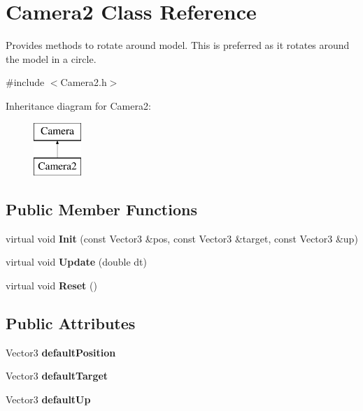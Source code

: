 \hypertarget{class_camera2}{\section{Camera2 Class Reference}
\label{class_camera2}
}


Provides methods to rotate around model. This is preferred as it rotates around the model in a circle.  




{\ttfamily \#include $<$Camera2.\+h$>$}

Inheritance diagram for Camera2\+:\begin{figure}[H]
\begin{center}
\leavevmode
\includegraphics[height=2.000000cm]{class_camera2}
\end{center}
\end{figure}
\subsection*{Public Member Functions}
\begin{DoxyCompactItemize}
\item 
\hypertarget{class_camera2_af3d4e37be651bac9c0a94ac0af021c35}{virtual void {\bfseries Init} (const Vector3 \&pos, const Vector3 \&target, const Vector3 \&up)}\label{class_camera2_af3d4e37be651bac9c0a94ac0af021c35}

\item 
\hypertarget{class_camera2_a1a54eeb46692c8806b7abea38a6301f3}{virtual void {\bfseries Update} (double dt)}\label{class_camera2_a1a54eeb46692c8806b7abea38a6301f3}

\item 
\hypertarget{class_camera2_aeea4a4fb229742098c0f79cddbc19280}{virtual void {\bfseries Reset} ()}\label{class_camera2_aeea4a4fb229742098c0f79cddbc19280}

\end{DoxyCompactItemize}
\subsection*{Public Attributes}
\begin{DoxyCompactItemize}
\item 
\hypertarget{class_camera2_a248471e0c272cd78f83dcf18ff907c4f}{Vector3 {\bfseries default\+Position}}\label{class_camera2_a248471e0c272cd78f83dcf18ff907c4f}

\item 
\hypertarget{class_camera2_ab353b257dd3bee73e305205f5fe9b0c5}{Vector3 {\bfseries default\+Target}}\label{class_camera2_ab353b257dd3bee73e305205f5fe9b0c5}

\item 
\hypertarget{class_camera2_a2f700dc0fb49589a7f394be6f2152a7b}{Vector3 {\bfseries default\+Up}}\label{class_camera2_a2f700dc0fb49589a7f394be6f2152a7b}

\end{DoxyCompactItemize}


